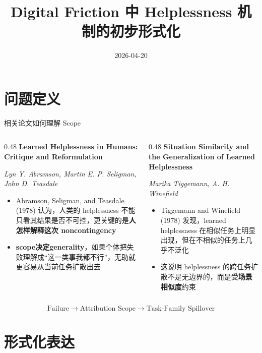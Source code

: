 \documentclass[aspectratio=169]{beamer}
\title[Helplessness 机制的初步形式化]{Digital Friction 中 Helplessness 机制的初步形式化}
\date{2026-04-20}
\begin{document}
\begin{frame}
    \titlepage
\end{frame}

\section{问题定义}

\begin{frame}[t]{相关论文如何理解 Scope}
\small
\begin{columns}[T]
\begin{column}{0.48\textwidth}
\textbf{Learned Helplessness in Humans: Critique and Reformulation}

\textit{Lyn Y. Abramson, Martin E. P. Seligman, John D. Teasdale}
\begin{itemize}
    \item Abramson, Seligman, and Teasdale (1978) 认为，人类的 helplessness 不能只看其结果是否不可控，更关键的是\textbf{人怎样解释这次 noncontingency}
    \item \mbox{\textbf{scope决定generality}}，如果个体把失败理解成“这一类事我都不行”，无助就更容易从当前任务扩散出去
\end{itemize}
\end{column}

\begin{column}{0.48\textwidth}
\textbf{Situation Similarity and the Generalization of Learned Helplessness}

\textit{Marika Tiggemann, A. H. Winefield}
\begin{itemize}
    \item Tiggemann and Winefield (1978) 发现，learned helplessness 在相似任务上明显出现，但在不相似的任务上几乎不泛化
    \item 这说明 helplessness 的跨任务扩散不是无边界的，而是受\textbf{场景相似度}约束
\end{itemize}
\end{column}
\end{columns}

\vspace{0.15cm}
\centering
\small
\[
\text{Failure} \rightarrow \text{Attribution Scope} \rightarrow \text{Task-Family Spillover}
\]
\end{frame}

\section{形式化表达}
\end{document}
